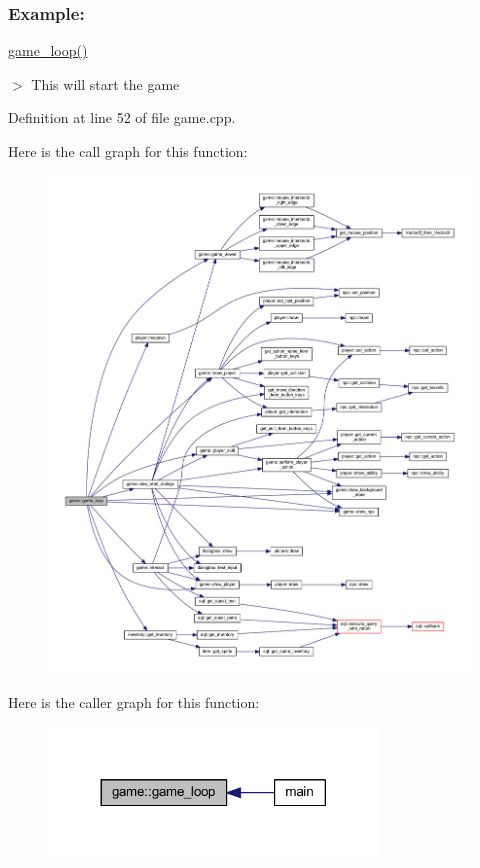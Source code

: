 \subsubsection*{Example\+: }

\hyperlink{classgame_a2b80a1fbc6d723e78d3c86d2f8ff24d4}{game\+\_\+loop()} ~\newline

\begin{DoxyItemize}
\item $>$ This will start the game 
\end{DoxyItemize}

Definition at line 52 of file game.\+cpp.

Here is the call graph for this function\+:
\nopagebreak
\begin{figure}[H]
\begin{center}
\leavevmode
\includegraphics[width=350pt]{classgame_a2b80a1fbc6d723e78d3c86d2f8ff24d4_cgraph}
\end{center}
\end{figure}
Here is the caller graph for this function\+:
\nopagebreak
\begin{figure}[H]
\begin{center}
\leavevmode
\includegraphics[width=248pt]{classgame_a2b80a1fbc6d723e78d3c86d2f8ff24d4_icgraph}
\end{center}
\end{figure}
\mbox{\label{classgame_a69793e75c155cb06e4f2c4d98c5da27c}} 
